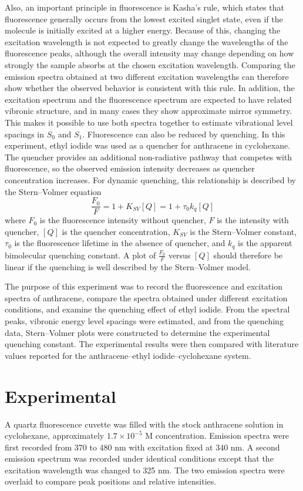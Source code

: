 \documentclass[12pt]{article}
\begin{document}
Also, an important principle in fluorescence is Kasha’s rule, which states that fluorescence generally occurs from the lowest excited singlet state, even if the molecule is initially excited at a higher energy. Because of this, changing the excitation wavelength is not expected to greatly change the wavelengths of the fluorescence peaks, although the overall intensity may change depending on how strongly the sample absorbs at the chosen excitation wavelength. Comparing the emission spectra obtained at two different excitation wavelengths can therefore show whether the observed behavior is consistent with this rule. In addition, the excitation spectrum and the fluorescence spectrum are expected to have related vibronic structure, and in many cases they show approximate mirror symmetry. This makes it possible to use both spectra together to estimate vibrational level spacings in $S_0$ and $S_1$. Fluorescence can also be reduced by quenching. In this experiment, ethyl iodide was used as a quencher for anthracene in cyclohexane. The quencher provides an additional non-radiative pathway that competes with fluorescence, so the observed emission intensity decreases as quencher concentration increases. For dynamic quenching, this relationship is described by the Stern–Volmer equation
\begin{equation}
\frac{F_0}{F} = 1 + K_{SV}[Q] = 1 + \tau_0 k_q [Q]
\label{eq:sv}
\end{equation}
where $F_0$ is the fluorescence intensity without quencher, $F$ is the intensity with quencher, $[Q]$ is the quencher concentration, $K
_{SV}$ is the Stern–Volmer constant, $\tau_0$ is the fluorescence lifetime in the absence of quencher, and $k_q$ is the apparent bimolecular quenching constant. A plot of $\frac{F_0}{F}$ versus $[Q]$ should therefore be linear if the quenching is well described by the Stern–Volmer model.

The purpose of this experiment was to record the fluorescence and excitation spectra of anthracene, compare the spectra obtained under different excitation conditions, and examine the quenching effect of ethyl iodide. From the spectral peaks, vibronic energy level spacings were estimated, and from the quenching data, Stern–Volmer plots were constructed to determine the experimental quenching constant. The experimental results were then compared with literature values reported for the anthracene–ethyl iodide–cyclohexane system.

\section*{Experimental}
A quartz fluorescence cuvette was filled with the stock anthracene solution in cyclohexane, approximately $1.7\times10^{-5}$ M concentration. Emission spectra were first recorded from 370 to 480 nm with excitation fixed at 340 nm. A second emission spectrum was recorded under identical conditions except that the excitation wavelength was changed to 325 nm. The two emission spectra were overlaid to compare peak positions and relative intensities.
\end{document}
